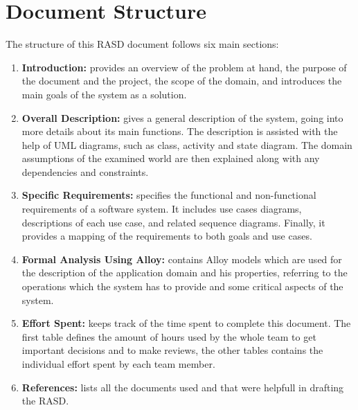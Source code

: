 \section{Document Structure}
The structure of this RASD document follows six main sections:
\begin{enumerate}
    \item \textbf{Introduction:}
          provides an overview of the problem at hand, the purpose of the document and
          the project, the scope of the domain, and introduces the main goals of the system as a solution.

    \item \textbf{Overall Description:}
          gives a general description of the system, going into more details about its main functions.
          The description is assisted with the help of UML diagrams, such as class, activity and state diagram.
          The domain assumptions of the examined world are then explained along with any dependencies and constraints.

    \item \textbf{Specific Requirements:}
          specifies the functional and non-functional requirements of a software system. 
          It includes use cases diagrams, descriptions of each use case, and related sequence diagrams. 
          Finally, it provides a mapping of the requirements to both goals and use cases.

    \item \textbf{Formal Analysis Using Alloy:}
          contains Alloy models which are used for the description of the application domain and his properties, 
          referring to the operations which the system has to provide and some critical aspects of the system.

    \item \textbf{Effort Spent:}
          keeps track of the time spent to complete this document.
          The first table defines the amount of hours used by the whole team to get important decisions and to make reviews,
          the other tables contains the individual effort spent by each team member.

    \item \textbf{References:}
          lists all the documents used and that were helpfull in drafting the RASD.
\end{enumerate}